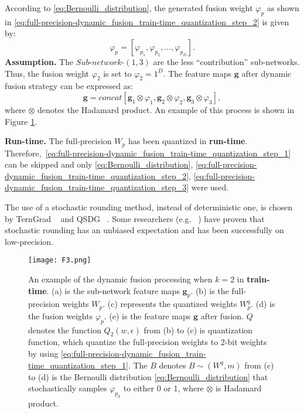 \documentclass[twoside,twocolumn]{article}
\begin{document}
According to \eqref{eq:Bernoulli_distribution}, the generated fusion weight $\varphi_p$ as shown in \eqref{eq:full-precision-dynamic_fusion_train-time_quantization_step_2} is given by:
\begin{equation}\label{eq:full-precision-dynamic_fusion_train-time_quantization_step_2}
\varphi _p=\left[ \varphi _{p_1},\varphi _{p_2},...,\varphi _{p_D} \right].
\end{equation}
\textbf{Assumption.} The $Sub$-$network$-$(1,3)$ are the less ``contribution'' sub-networks. Thus, the fusion weight $\varphi _2$ is set to $\varphi _2=1^D$. The feature maps $\boldsymbol{g}$ after dynamic fusion strategy can be expressed as:
\begin{equation}\label{eq:full-precision-dynamic_fusion_train-time_quantization_step_3}
\boldsymbol{g}=concat\left[ \boldsymbol{g}_1\otimes \varphi _1, \boldsymbol{g}_2\otimes \varphi _2, \boldsymbol{g}_3\otimes \varphi _3 \right],
\end{equation}
where $\otimes$ denotes the Hadamard product. An example of this process is shown in Figure \ref{fig:F3}.

\noindent\textbf{Run-time.} The full-precision $W_p$ has been quantized in \textbf{run-time}. Therefore,~\eqref{eq:full-precision-dynamic_fusion_train-time_quantization_step_1} can be skipped and only \eqref{eq:Bernoulli_distribution},  \eqref{eq:full-precision-dynamic_fusion_train-time_quantization_step_2}, \eqref{eq:full-precision-dynamic_fusion_train-time_quantization_step_3} were used.

The use of a stochastic rounding method, instead of deterministic one, is chosen by TernGrad ~\cite{b40} and QSDG ~\cite{b47}. Some researchers (e.g. ~\cite{b16,b48}) have proven that stochastic rounding has an unbiased expectation and has been successfully on low-precision.

\begin{figure}
  \centering
  \texttt{[image: F3.png]}\\
  \caption{An example of the dynamic fusion processing when $k=2$ in \textbf{train-time}. (a) is the sub-network feature maps $\boldsymbol{g}_p$. (b) is the full-precision weights $W_p$. (c) represents the quantized weights $W_p^q$. (d) is the fusion weights $\varphi_p$. (e) is the feature maps $\boldsymbol{g}$ after fusion. $Q$ denotes the function $Q_2(w,\epsilon)$ from (b) to (c) is quantization function, which quantize the full-precision weights to 2-bit weights by using \eqref{eq:full-precision-dynamic_fusion_train-time_quantization_step_1}. The $B$ denotes $B\sim(W^q,m)$ from (c) to (d) is the Bernoulli distribution \eqref{eq:Bernoulli_distribution} that stochastically samples $\varphi_{p_d}$ to either 0 or 1, where $\otimes$ is Hadamard product.}\label{fig:F3}
\end{figure}
\end{document}
